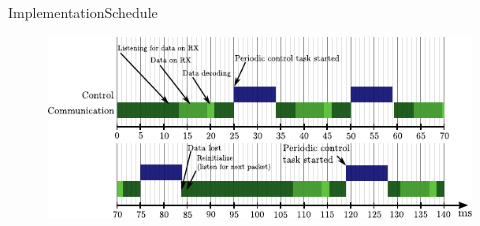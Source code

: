 \begin{frame}{Implementation}{Schedule}
  \begin{figure}[H]
    \hspace*{-.8cm}
    \includegraphics[width=1.1\linewidth]{figures/newTimingDiagram}
  \end{figure}
\end{frame}

